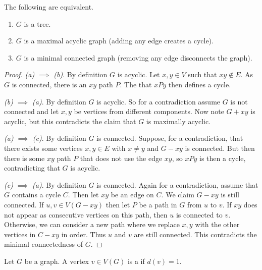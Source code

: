 \documentclass[a4paper]{scrreprt}
\begin{document}
\begin{example}
\begin{center}
\begin{tikzpicture}[x=0.75pt,y=0.75pt,yscale=-1,xscale=1]
\end{tikzpicture}

	\end{center}
\end{example}



\begin{proposition}
	The following are equivalent.
	\begin{enumerate}[label=(\alph*)]
		\item $G$ is a tree.
		\item $G$ is a maximal acyclic graph (adding any edge creates a cycle).
		\item $G$ is a minimal connected graph (removing any edge disconnects the graph).
	\end{enumerate}
\end{proposition}
\begin{proof}
	\emph{(a) $\implies$ (b)}. By definition $G$ is acyclic. Let $x, y \in V$ such that $xy \not \in E$. As $G$ is connected, there is an $xy$ path $P$. The that $xPy$ then defines a cycle.

	\emph{(b) $\implies$ (a)}. By definition $G$ is acyclic. 
	So for a contradiction assume $G$ is not connected and let $x, y$ be vertices from different components. Now note $G + xy$ is acyclic, but this contradicts the claim that $G$ is maximally acyclic.

	\emph{(a) $\implies$ (c)}. By definition $G$ is connected. Suppose, for a contradiction, that there exists some vertices $x, y \in E$ with $x \neq y$ and $G - xy$ is connected. But then there is some $xy$ path $P$ that does not use the edge $xy$, so $xPy$ is then a cycle, contradicting that $G$ is acyclic.

	\emph{(c) $\implies$ (a)}. By definition $G$ is connected. Again for a contradiction, assume that $G$ contains a cycle $C$. Then let $xy$ be an edge on $C$. We claim $G - xy$ is still connected. If $u, v \in V(G - xy)$ then let $P$ be a path in $G$ from $u$ to $v$. If $xy$ does not appear as consecutive vertices on this path, then $u$ is connected to $v$. Otherwise, we can consider a new path where we replace $x,y$ with the other vertices in $C - xy$ in order. Thus $u$ and $v$ are still connected. This contradicts the minimal connectedness of $G$. 

\end{proof}

\begin{definition}[Leaf]
	Let $G$ be a graph. A vertex $v \in V(G)$ is a  if $d(v) = 1$.
\end{definition}
\end{document}
